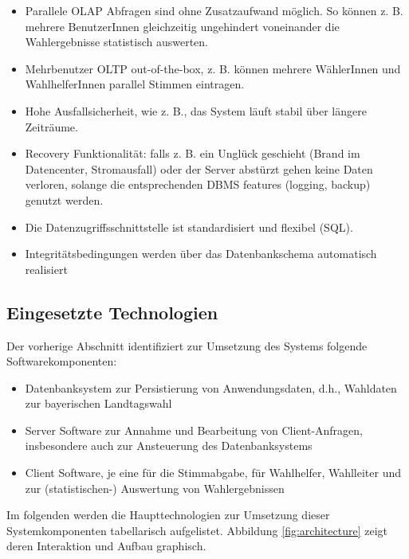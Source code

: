 \documentclass[a4paper,12pt]{article}
\begin{document}
\begin{itemize}
      \item Parallele OLAP Abfragen sind ohne Zusatzaufwand möglich. So können z. B. mehrere BenutzerInnen gleichzeitig ungehindert voneinander die Wahlergebnisse statistisch auswerten.
      \item Mehrbenutzer OLTP out-of-the-box, z. B. können mehrere WählerInnen und WahlhelferInnen parallel Stimmen
            eintragen.
      \item Hohe Ausfallsicherheit, wie z. B., das System läuft stabil über längere Zeiträume.
      \item Recovery Funktionalität: falls z. B. ein Unglück geschieht (Brand im Datencenter, Stromausfall) 
            oder der Server abstürzt gehen keine Daten verloren, solange die entsprechenden DBMS features 
            (logging, backup) genutzt werden.
      \item Die Datenzugriffsschnittstelle ist standardisiert und flexibel (SQL).
      \item Integritätsbedingungen werden über das Datenbankschema automatisch realisiert
\end{itemize}

\subsection{Eingesetzte Technologien}
Der vorherige Abschnitt identifiziert zur Umsetzung des Systems folgende Softwarekomponenten:
\begin{itemize}
      \item Datenbanksystem zur Persistierung von Anwendungsdaten, d.h., Wahldaten zur bayerischen Landtagswahl
      \item Server Software zur Annahme und Bearbeitung von Client-Anfragen, insbesondere auch zur Ansteuerung des Datenbanksystems
      \item Client Software, je eine für die Stimmabgabe, für Wahlhelfer, Wahlleiter und zur (statistischen-) Auswertung von Wahlergebnissen 
\end{itemize}
Im folgenden werden die Haupttechnologien zur Umsetzung dieser Systemkomponenten tabellarisch aufgelistet. Abbildung \ref{fig:architecture} zeigt
deren Interaktion und Aufbau graphisch.
\end{document}
